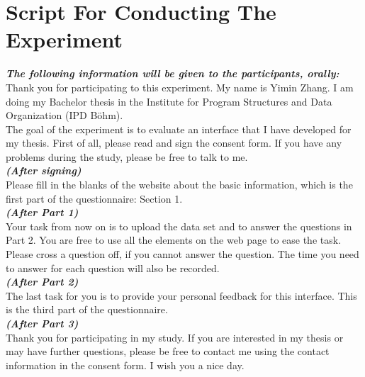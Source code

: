 \section{Script For Conducting The Experiment}
\label{sec:Evaluation:Script}
\textit{\textbf{The following information will be given to the participants, orally:}}\\
Thank you for participating to this experiment. My name is Yimin Zhang. I am doing my Bachelor thesis in the Institute for Program Structures and Data Organization (IPD Böhm).\\
The goal of the experiment is to evaluate an interface that I have developed for my thesis. First of all, please read and sign the consent form. If you have any problems during the study, please be free to talk to me.\\
\textbf{\textit{(After signing)}}\\
Please fill in the blanks of the website about the basic information, which is the first part of the questionnaire: Section 1.\\
\textbf{\textit{(After Part 1)}}\\
Your task from now on is to upload the data set and to answer the questions in Part 2. You are free to use all the elements on the web page to ease the task. Please cross a question off, if you cannot answer the question. The time you need to answer for each question will also be recorded.\\
\textbf{\textit{(After Part 2)}}\\
The last task for you is to provide your personal feedback for this interface. This is the third part of the questionnaire.\\
\textbf{\textit{(After Part 3)}}\\
Thank you for participating in my study. If you are interested in my thesis or may have further questions, please be free to contact me using the contact information in the consent form. I wish you a nice day.\\

